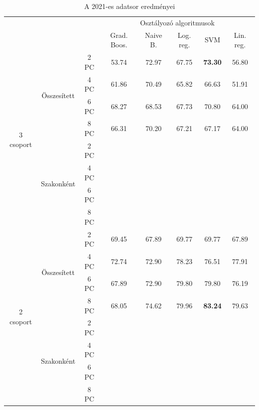 \documentclass[12pt]{article}
\begin{document}
\begin{table}[H]
\centering
\begin{tabular}{ccc|ccccc}

    &&&\multicolumn{5}{c}{Osztályozó algoritmusok} \\
    &&& Grad. Boos. &  Naive B. & Log. reg.  &  SVM & Lin. reg. \\ 
        \hline
    \multirow{8}{*}{3 csoport}& \multirow{4}{*}{Összesített}&2 PC&53.74&72.97&67.75&\textbf{73.30}&56.80 \\
    												&&4 PC&61.86&70.49&65.82&66.63&51.91\\
    												&&6 PC&68.27&68.53&67.73&70.80&64.00\\
    												&&8 PC&66.31&70.20&67.21&67.17&64.00\\\cline{3-8}%
    						 & \multirow{4}{*}{Szakonként}&2 PC&&&&&\\
    												&&4 PC&&&&&\\
    												&&6 PC&&&&&\\
    												&&8 PC&&&&&\\
    \hline
    \hline
    \multirow{8}{*}{2 csoport}& \multirow{4}{*}{Összesített}&2 PC&69.45&67.89&69.77&69.77&67.89 \\
    												&&4 PC&72.74&72.90&78.23&76.51&77.91\\
    												&&6 PC&67.89&72.90&79.80&79.80&76.19\\
    												&&8 PC&68.05&74.62&79.96&\textbf{83.24}&79.63\\\cline{3-8}
    						 & \multirow{4}{*}{Szakonként}&2 PC&&&&&\\
    												&&4 PC&&&&&\\
    												&&6 PC&&&&&\\
    												&&8 PC&&&&&\\
    												\hline
\end{tabular}
\caption{A 2021-es adatsor eredményei}
\label{tab:multicol2}
\end{table}


%	




\begin{thebibliography}{9}
\end{thebibliography}
\end{document}
